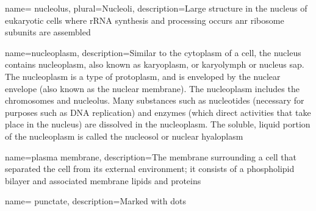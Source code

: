  {
	name= {nucleolus},
	plural={Nucleoli},
	description={Large structure in the nucleus of eukaryotic cells where rRNA synthesis and processing occurs anr ribosome subunits are assembled\cite{lodish2003molecular}}}


 {
	name={nucleoplasm},
	description={Similar to the cytoplasm of a cell, the nucleus contains nucleoplasm, also known as karyoplasm, or karyolymph or nucleus sap. The nucleoplasm is a type of protoplasm, and is enveloped by the nuclear envelope (also known as the nuclear membrane). The nucleoplasm includes the chromosomes and nucleolus. Many substances such as nucleotides (necessary for purposes such as DNA replication) and enzymes (which direct activities that take place in the nucleus) are dissolved in the nucleoplasm. The soluble, liquid portion of the nucleoplasm is called the nucleosol or nuclear hyaloplasm\cite{enwiki:972970373}}}

	
 {
	name={plasma membrane},
	description={The membrane surrounding a cell that separated the cell from its external environment; it consists of a phospholipid bilayer and associated membrane lipids and proteins\cite{lodish2003molecular}}}

 {
	name= {punctate},
	description={Marked with dots}}

